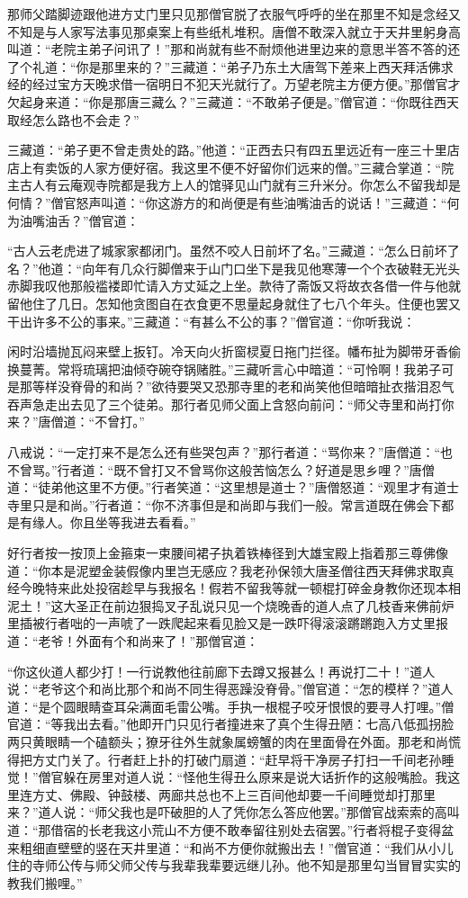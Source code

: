 \documentclass[12pt,UTF8]{ctexbook}
\begin{document}
{那师父踏脚迹跟他进方丈门里只见那僧官脱了衣服气呼呼的坐在那里不知是念经又不知是与人家写法事见那桌案上有些纸札堆积。唐僧不敢深入就立于天井里躬身高叫道：“老院主弟子问讯了！”那和尚就有些不耐烦他进里边来的意思半答不答的还了个礼道：“你是那里来的？”三藏道：“弟子乃东土大唐驾下差来上西天拜活佛求经的经过宝方天晚求借一宿明日不犯天光就行了。万望老院主方便方便。”那僧官才欠起身来道：“你是那唐三藏么？”三藏道：“不敢弟子便是。”僧官道：“你既往西天取经怎么路也不会走？”

三藏道：“弟子更不曾走贵处的路。”他道：“正西去只有四五里远近有一座三十里店店上有卖饭的人家方便好宿。我这里不便不好留你们远来的僧。”三藏合掌道：“院主古人有云庵观寺院都是我方上人的馆驿见山门就有三升米分。你怎么不留我却是何情？”僧官怒声叫道：“你这游方的和尚便是有些油嘴油舌的说话！”三藏道：“何为油嘴油舌？”僧官道：

“古人云老虎进了城家家都闭门。虽然不咬人日前坏了名。”三藏道：“怎么日前坏了名？”他道：“向年有几众行脚僧来于山门口坐下是我见他寒薄一个个衣破鞋无光头赤脚我叹他那般褴褛即忙请入方丈延之上坐。款待了斋饭又将故衣各借一件与他就留他住了几日。怎知他贪图自在衣食更不思量起身就住了七八个年头。住便也罢又干出许多不公的事来。”三藏道：“有甚么不公的事？”僧官道：“你听我说：

闲时沿墙抛瓦闷来壁上扳钉。冷天向火折窗棂夏日拖门拦径。幡布扯为脚带牙香偷换蔓菁。常将琉璃把油倾夺碗夺锅赌胜。”三藏听言心中暗道：“可怜啊！我弟子可是那等样没脊骨的和尚？”欲待要哭又恐那寺里的老和尚笑他但暗暗扯衣揩泪忍气吞声急走出去见了三个徒弟。那行者见师父面上含怒向前问：“师父寺里和尚打你来？”唐僧道：“不曾打。”

八戒说：“一定打来不是怎么还有些哭包声？”那行者道：“骂你来？”唐僧道：“也不曾骂。”行者道：“既不曾打又不曾骂你这般苦恼怎么？好道是思乡哩？”唐僧道：“徒弟他这里不方便。”行者笑道：“这里想是道士？”唐僧怒道：“观里才有道士寺里只是和尚。”行者道：“你不济事但是和尚即与我们一般。常言道既在佛会下都是有缘人。你且坐等我进去看看。”

好行者按一按顶上金箍束一束腰间裙子执着铁棒径到大雄宝殿上指着那三尊佛像道：“你本是泥塑金装假像内里岂无感应？我老孙保领大唐圣僧往西天拜佛求取真经今晚特来此处投宿趁早与我报名！假若不留我等就一顿棍打碎金身教你还现本相泥土！”这大圣正在前边狠捣叉子乱说只见一个烧晚香的道人点了几枝香来佛前炉里插被行者咄的一声唬了一跌爬起来看见脸又是一跌吓得滚滚蹡蹡跑入方丈里报道：“老爷！外面有个和尚来了！”那僧官道：

“你这伙道人都少打！一行说教他往前廊下去蹲又报甚么！再说打二十！”道人说：“老爷这个和尚比那个和尚不同生得恶躁没脊骨。”僧官道：“怎的模样？”道人道：“是个圆眼睛查耳朵满面毛雷公嘴。手执一根棍子咬牙恨恨的要寻人打哩。”僧官道：“等我出去看。”他即开门只见行者撞进来了真个生得丑陋：七高八低孤拐脸两只黄眼睛一个磕额头；獠牙往外生就象属螃蟹的肉在里面骨在外面。那老和尚慌得把方丈门关了。行者赶上扑的打破门扇道：“赶早将干净房子打扫一千间老孙睡觉！”僧官躲在房里对道人说：“怪他生得丑么原来是说大话折作的这般嘴脸。我这里连方丈、佛殿、钟鼓楼、两廊共总也不上三百间他却要一千间睡觉却打那里来？”道人说：“师父我也是吓破胆的人了凭你怎么答应他罢。”那僧官战索索的高叫道：“那借宿的长老我这小荒山不方便不敢奉留往别处去宿罢。”行者将棍子变得盆来粗细直壁壁的竖在天井里道：“和尚不方便你就搬出去！”僧官道：“我们从小儿住的寺师公传与师父师父传与我辈我辈要远继儿孙。他不知是那里勾当冒冒实实的教我们搬哩。”

}
\end{document}
